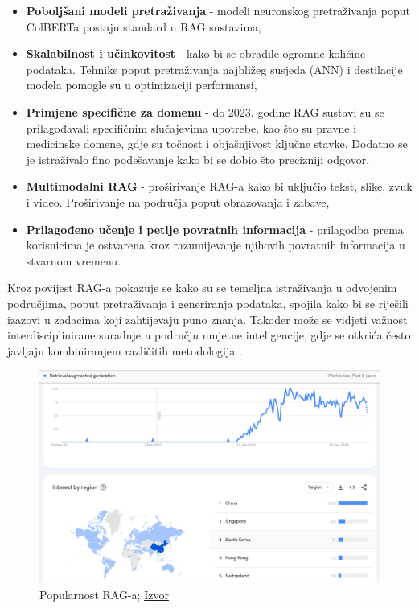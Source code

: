 \documentclass[]{foi}
\begin{document}
\begin{itemize}
    \item \textbf{Poboljšani modeli pretraživanja} - modeli neuronskog pretraživanja poput ColBERTa postaju standard u RAG sustavima,
    \item \textbf{Skalabilnost i učinkovitost} - kako bi se obradile ogromne količine podataka. Tehnike poput pretraživanja najbližeg susjeda (ANN) i destilacije modela pomogle su u optimizaciji performansi,
    \item \textbf{Primjene specifične za domenu} - do 2023. godine RAG sustavi su se prilagođavali specifičnim slučajevima upotrebe, kao što su pravne i medicinske domene, gdje su točnost i objašnjivost ključne stavke. Dodatno se je istraživalo fino podešavanje kako bi se dobio što precizniji odgovor, 
    \item \textbf{Multimodalni RAG} - proširivanje RAG-a kako bi uključio tekst, slike, zvuk i video. Proširivanje na područja poput obrazovanja i zabave, 
    \item \textbf{Prilagođeno učenje i petlje povratnih informacija}  - prilagodba prema korisnicima je ostvarena kroz razumijevanje njihovih povratnih informacija u stvarnom vremenu.
\end{itemize}

Kroz povijest RAG-a pokazuje se kako su se temeljna istraživanja u odvojenim područjima, poput pretraživanja i generiranja podataka, spojila kako bi se riješili izazovi u zadacima koji zahtijevaju puno znanja.
Također može se vidjeti važnost interdisciplinirane suradnje u području umjetne inteligencije, gdje se otkrića često javljaju kombiniranjem različitih metodologija \cite{custom_ai_studio2025}. 

\begin{figure}[h]
  \centering
  \includegraphics[width=1\textwidth]{./assets/PopularnostRaga.png}
  \caption{Popularnost RAG-a; \href{https://tinyurl.com/3cjn7n7k}{Izvor}}
  \label{fig:slika8}
\end{figure}
\end{document}
